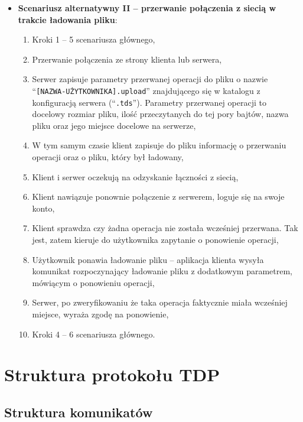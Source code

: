 \documentclass[8pt,a4paper]{article}
\newcommand{\quotes}[1]{``#1''}
\newcommand{\quotcode}[1]{\quotes{\texttt{#1}}}
\begin{document}
\begin{itemize}
    \item \textbf{Scenariusz alternatywny II -- przerwanie połączenia z siecią w trakcie ładowania pliku}:
    \begin{enumerate}
        \item Kroki 1 -- 5 scenariusza głównego,
        \item Przerwanie połączenia ze strony klienta lub serwera,
        \item Serwer zapisuje parametry przerwanej operacji do pliku o nazwie \quotcode{[NAZWA-UŻYTKOWNIKA].upload} znajdującego się w katalogu z konfiguracją serwera (\quotcode{.tds}). Parametry przerwanej operacji to docelowy rozmiar pliku, ilość przeczytanych do tej pory bajtów, nazwa pliku oraz jego miejsce docelowe na serwerze,
        \item W tym samym czasie klient zapisuje do pliku informację o przerwaniu operacji oraz o pliku, który był ładowany,
        \item Klient i serwer oczekują na odzyskanie łączności z siecią,
        \item Klient nawiązuje ponownie połączenie z serwerem, loguje się na swoje konto,
        \item Klient sprawdza czy żadna operacja nie została wcześniej przerwana. Tak jest, zatem kieruje do użytkownika zapytanie o ponowienie operacji,
        \item Użytkownik ponawia ładowanie pliku -- aplikacja klienta wysyła komunikat rozpoczynający ładowanie pliku z dodatkowym parametrem, mówiącym o ponowieniu operacji,
        \item Serwer, po zweryfikowaniu że taka operacja faktycznie miała wcześniej miejsce, wyraża zgodę na ponowienie,
        \item Kroki 4 -- 6 scenariusza głównego.
    \end{enumerate}
\end{itemize}

\section{Struktura protokołu TDP}
\subsection{Struktura komunikatów}
\end{document}
